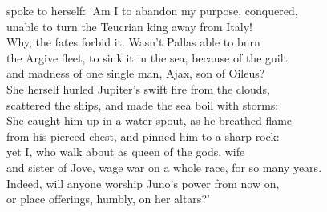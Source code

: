 \documentclass[12pt, a5paper, titlepage]{letter}
\begin{document}
spoke to herself: `Am I to abandon my purpose, conquered,\\
unable to turn the Teucrian king away from Italy!\\
Why, the fates forbid it. Wasn't Pallas able to burn\\
the Argive fleet, to sink it in the sea, because of the guilt\\
and madness of one single man, Ajax, son of Oileus?\\
She herself hurled Jupiter's swift fire from the clouds,\\
scattered the ships, and made the sea boil with storms:\\
She caught him up in a water-spout, as he breathed flame\\
from his pierced chest, and pinned him to a sharp rock:\\
yet I, who walk about as queen of the gods, wife\\
and sister of Jove, wage war on a whole race, for so many years.\\
Indeed, will anyone worship Juno's power from now on,\\
or place offerings, humbly, on her altars?'
\end{document}

